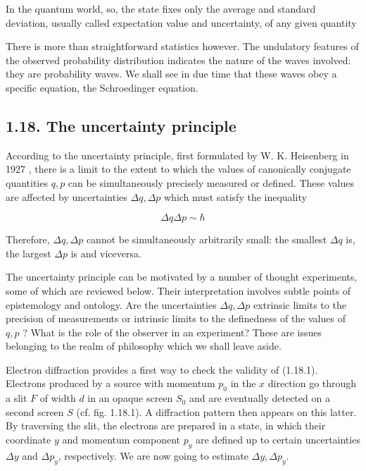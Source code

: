 \documentclass{article}
\begin{document}
In the quantum world, so, the state fixes only the average and standard deviation, usually called expectation value and uncertainty, of any given quantity

There is more than straightforward statistics however. The undulatory features of the observed probability distribution indicates the nature of the waves involved: they are probability waves. We shall see in due time that these waves obey a specific equation, the Schroedinger equation.

\subsection*{1.18. The uncertainty principle}

According to the uncertainty principle, first formulated by W. K. Heisenberg in 1927 , there is a limit to the extent to which the values of canonically conjugate quantities $q, p$ can be simultaneously precisely measured or defined. These values are affected by uncertainties $\Delta q, \Delta p$ which must satisfy the inequality
 
\begin{equation*}
\Delta q \Delta p \sim \hbar \tag{1.18.1}
\end{equation*}
 

Therefore, $\Delta q, \Delta p$ cannot be simultaneously arbitrarily small: the smallest $\Delta q$ is, the largest $\Delta p$ is and viceversa.

The uncertainty principle can be motivated by a number of thought experiments, some of which are reviewed below. Their interpretation involves subtle points of epistemology and ontology. Are the uncertainties $\Delta q, \Delta p$ extrinsic limits to the precision of measurements or intrinsic limits to the definedness of the values of $q, p$ ? What is the role of the observer in an experiment? These are issues belonging to the realm of philosophy which we shall leave aside.

Electron diffraction provides a first way to check the validity of (1.18.1). Electrons produced by a source with momentum $p_{0}$ in the $x$ direction go through a slit $F$ of width $d$ in an opaque screen $S_{0}$ and are eventually detected on a second screen $S$ (cf. fig. 1.18.1). A diffraction pattern then appears on this latter. By traversing the slit, the electrons are prepared in a state, in which their coordinate $y$ and momentum component $p_{y}$ are defined up to certain uncertainties $\Delta y$ and $\Delta p_{y}$, respectively. We are now going to estimate $\Delta y, \Delta p_{y}$.
\end{document}
